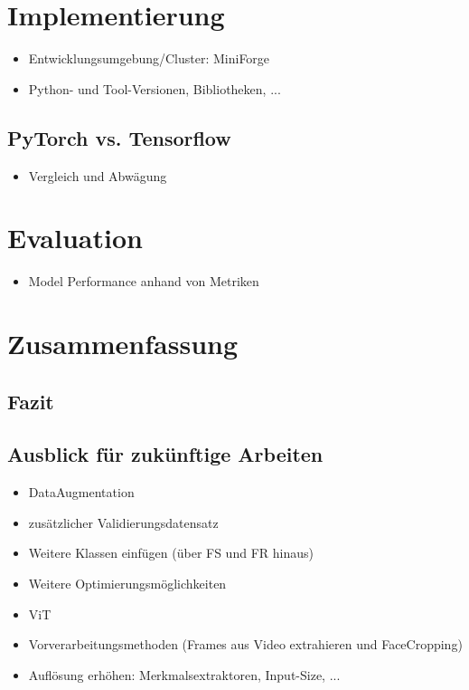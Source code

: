 \documentclass{article}
\begin{document}
    \section{Implementierung}
    \begin{itemize}
        \item Entwicklungsumgebung/Cluster: MiniForge
        \item Python- und Tool-Versionen, Bibliotheken, ... %
    \end{itemize}
    \subsection{PyTorch vs. Tensorflow}
    \begin{itemize}
        \item Vergleich und Abwägung
    \end{itemize}
    \section{Evaluation}
    \begin{itemize}
        \item Model Performance anhand von Metriken
    \end{itemize}

    \section{Zusammenfassung}
    \subsection{Fazit}
    \subsection{Ausblick für zukünftige Arbeiten}
    \begin{itemize}
        \item DataAugmentation
        \item zusätzlicher Validierungsdatensatz %
        \item Weitere Klassen einfügen (über FS und FR hinaus)
        \item Weitere Optimierungsmöglichkeiten
        \item ViT
        \item Vorverarbeitungsmethoden (Frames aus Video extrahieren und FaceCropping)
        \item Auflösung erhöhen: Merkmalsextraktoren, Input-Size, ...
    \end{itemize}
\end{document}
